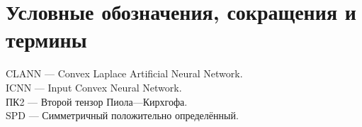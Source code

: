 \chapter*{Условные обозначения, сокращения и термины}
CLANN — Convex Laplace Artificial Neural Network.\\
ICNN — Input Convex Neural Network.\\
ПК2 — Второй тензор Пиола—Кирхгофа.\\
SPD — Симметричный положительно определённый.\\


